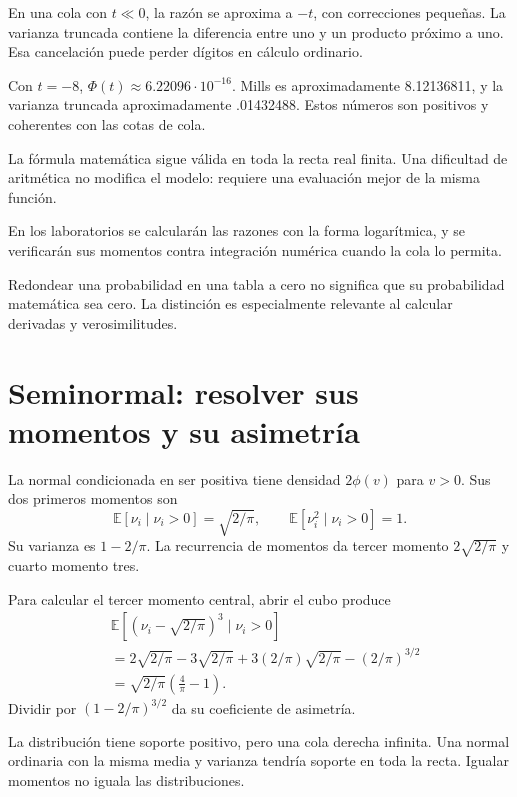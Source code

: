\documentclass[11pt,a4paper]{article}
\newcommand{\E}{\mathbb E}
\begin{document}
En una cola con \(t\ll0\),
la razón se aproxima a \(-t\),
con correcciones pequeñas.
La varianza truncada contiene
la diferencia entre uno
y un producto próximo a uno.
Esa cancelación puede perder
dígitos en cálculo ordinario.

\begin{ejemplo}
Con \(t=-8\),
\(\Phi(t)\approx6.22096\cdot10^{-16}\).
Mills es aproximadamente 8.12136811,
y la varianza truncada aproximadamente .01432488.
Estos números son positivos y
coherentes con las cotas de cola.
\end{ejemplo}
La fórmula matemática sigue válida
en toda la recta real finita.
Una dificultad de aritmética
no modifica el modelo:
requiere una evaluación mejor
de la misma función.

En los laboratorios se calcularán
las razones con la forma logarítmica,
y se verificarán sus momentos
contra integración numérica
cuando la cola lo permita.

Redondear una probabilidad en
una tabla a cero no significa
que su probabilidad matemática
sea cero. La distinción es
especialmente relevante al calcular
derivadas y verosimilitudes.


\clearpage
\section{Seminormal: resolver sus momentos y su asimetría}

La normal condicionada en ser positiva
tiene densidad \(2\phi(v)\)
para \(v>0\).
Sus dos primeros momentos son
\[
\E[\nu_i\mid\nu_i>0]=\sqrt{2/\pi},
\qquad
\E[\nu_i^2\mid\nu_i>0]=1.
\]
Su varianza es
\(1-2/\pi\).
La recurrencia de momentos da
tercer momento \(2\sqrt{2/\pi}\)
y cuarto momento tres.

Para calcular el tercer momento central,
abrir el cubo produce
\[
\begin{aligned}
&\E[(\nu_i-\sqrt{2/\pi})^3\mid\nu_i>0]\\
&=2\sqrt{2/\pi}
-3\sqrt{2/\pi}
+3(2/\pi)\sqrt{2/\pi}
-(2/\pi)^{3/2}\\
&=\sqrt{2/\pi}\left(\frac4\pi-1\right).
\end{aligned}
\]
Dividir por \((1-2/\pi)^{3/2}\)
da su coeficiente de asimetría.

La distribución tiene soporte positivo,
pero una cola derecha infinita.
Una normal ordinaria con la misma
media y varianza tendría soporte
en toda la recta.
Igualar momentos no iguala
las distribuciones.
\end{document}

